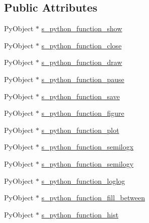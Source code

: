 \subsection*{Public Attributes}
\begin{DoxyCompactItemize}
\item 
Py\+Object $\ast$ \hyperlink{structmatplotlibcpp_1_1detail_1_1__interpreter_a7630f4b6c75cb15e0979f94b9c84bc1e}{s\+\_\+python\+\_\+function\+\_\+show}
\item 
Py\+Object $\ast$ \hyperlink{structmatplotlibcpp_1_1detail_1_1__interpreter_a43f3de18936dd4d4ffef3046b64d686e}{s\+\_\+python\+\_\+function\+\_\+close}
\item 
Py\+Object $\ast$ \hyperlink{structmatplotlibcpp_1_1detail_1_1__interpreter_a3c4981fa6eea6f2bfc9bb2e685109032}{s\+\_\+python\+\_\+function\+\_\+draw}
\item 
Py\+Object $\ast$ \hyperlink{structmatplotlibcpp_1_1detail_1_1__interpreter_ad4cc1ddd59ab9f4008269ade1a219ffa}{s\+\_\+python\+\_\+function\+\_\+pause}
\item 
Py\+Object $\ast$ \hyperlink{structmatplotlibcpp_1_1detail_1_1__interpreter_a73bc4fbc6e14bf0df3dcde3554f7ac03}{s\+\_\+python\+\_\+function\+\_\+save}
\item 
Py\+Object $\ast$ \hyperlink{structmatplotlibcpp_1_1detail_1_1__interpreter_a5d283724b9e24217b5f4aef9950789fa}{s\+\_\+python\+\_\+function\+\_\+figure}
\item 
Py\+Object $\ast$ \hyperlink{structmatplotlibcpp_1_1detail_1_1__interpreter_a57d34acc4f358c9b16a352227b7d691d}{s\+\_\+python\+\_\+function\+\_\+plot}
\item 
Py\+Object $\ast$ \hyperlink{structmatplotlibcpp_1_1detail_1_1__interpreter_ac2bda54e2d051328d7dcd62d825b2eac}{s\+\_\+python\+\_\+function\+\_\+semilogx}
\item 
Py\+Object $\ast$ \hyperlink{structmatplotlibcpp_1_1detail_1_1__interpreter_a3aec514f70fba364c7315d4bafe01a54}{s\+\_\+python\+\_\+function\+\_\+semilogy}
\item 
Py\+Object $\ast$ \hyperlink{structmatplotlibcpp_1_1detail_1_1__interpreter_a725ff094feb0b74c0ab70038405e26ce}{s\+\_\+python\+\_\+function\+\_\+loglog}
\item 
Py\+Object $\ast$ \hyperlink{structmatplotlibcpp_1_1detail_1_1__interpreter_af9e80729f91e2295b88e6ed5788652c0}{s\+\_\+python\+\_\+function\+\_\+fill\+\_\+between}
\item 
Py\+Object $\ast$ \hyperlink{structmatplotlibcpp_1_1detail_1_1__interpreter_a1f1e3b067a154cf2e588a198f192bb24}{s\+\_\+python\+\_\+function\+\_\+hist}

\end{DoxyCompactItemize}
